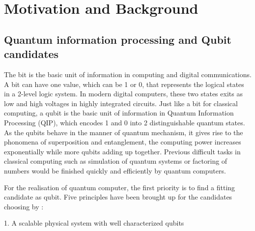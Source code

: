 
\chapter[Motivation and Background]
{Motivation and Background} %

\label{Chapter1} %







\newcommand{\keyword}[1]{\textbf{#1}}
\newcommand{\tabhead}[1]{\textbf{#1}}
\newcommand{\code}[1]{\texttt{#1}}
\newcommand{\file}[1]{\texttt{\bfseries#1}}
\newcommand{\option}[1]{\texttt{\itshape#1}}


\section[Quantum information processing and Qubit candidates]{Quantum information processing and Qubit candidates}

The bit is the basic unit of information in computing and digital communications. A bit can have one value, which can be 1 or 0, that represents the logical states in a 2-level logic system. In modern digital computers, these two states exits as low and high voltages in highly integrated circuits. Just like a bit for classical computing, a qubit is the basic unit of information in Quantum Information Processing (QIP), which encodes 1 and 0 into 2 distinguishable quantum states. As the qubits behave in the manner of quantum mechanism, it gives rise to the phonomena of superposition and entanglement, the computing power increases exponentially while more qubits adding up together. Previous difficult tasks in classical computing such as simulation of quantum systems or factoring of numbers would be finished quickly and efficiently by quantum computers.

For the realisation of quantum computer,  the first priority is to find a fitting candidate as qubit. Five principles have been brought up for the candidates choosing by \citep{divincenzo_physical_2000}:

1. A scalable physical system with well characterized qubits

